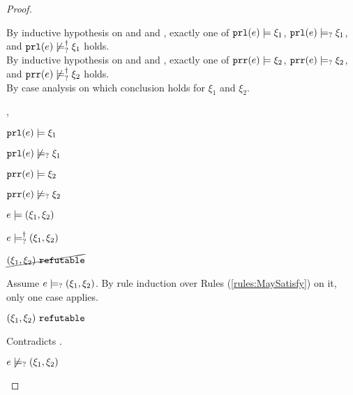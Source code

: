 \begin{proof}
\begin{byCases}
\begin{byCases}
        By inductive hypothesis on  and  and , exactly one of $\mathtt{prl}(e) \models \xi_1$, $\mathtt{prl}(e) \models_{?} \xi_1$, and $\mathtt{prl}(e) \not\models_{?}^{\dag} \xi_1$ holds. \\
        By inductive hypothesis on  and  and , exactly one of $\mathtt{prr}(e) \models \xi_2$, $\mathtt{prr}(e) \models_{?} \xi_2$, and $\mathtt{prr}(e) \not\models_{?}^{\dag} \xi_2$ holds. \\
        By case analysis on which conclusion holds for $\xi_1$ and $\xi_2$.
        \begin{byCases}
        \item[\csatisfy{\hprl{e}}{\xi_1},\csatisfy{\hprr{e}}{\xi_2}]
            \begin{pfsteps*}
            \item $\mathtt{prl}(e) \models \xi_1$  
            \item $\mathtt{prl}(e) \not\models_{?} \xi_1$  
            \item $\mathtt{prr}(e) \models \xi_2$  
            \item $\mathtt{prr}(e) \not\models_{?} \xi_2$  
            \item $e \models (\xi_1 , \xi_2)$  
            \item $e \models_{?}^{\dag} (\xi_1 , \xi_2)$ 
            \item $\cancel{(\xi_1 , \xi_2) ~\mathtt{refutable}}$  
            \end{pfsteps*}
            Assume $e \models_{?} (\xi_1 , \xi_2)$. By rule induction over Rules (\ref{rules:MaySatisfy}) on it, only one case applies.
            \begin{byCases}
            \item[\text{(\ref{rule:CMSNotVal})}]
                \begin{pfsteps*}
                \item $(\xi_1 , \xi_2) ~\mathtt{refutable}$ 
                \end{pfsteps*}
                Contradicts .
            \end{byCases}
            \begin{pfsteps*}
            \item $e \not\models_{?} (\xi_1 , \xi_2)$ 
            \end{pfsteps*}
            

\end{byCases}
\end{byCases}
\end{byCases}
\end{proof}
